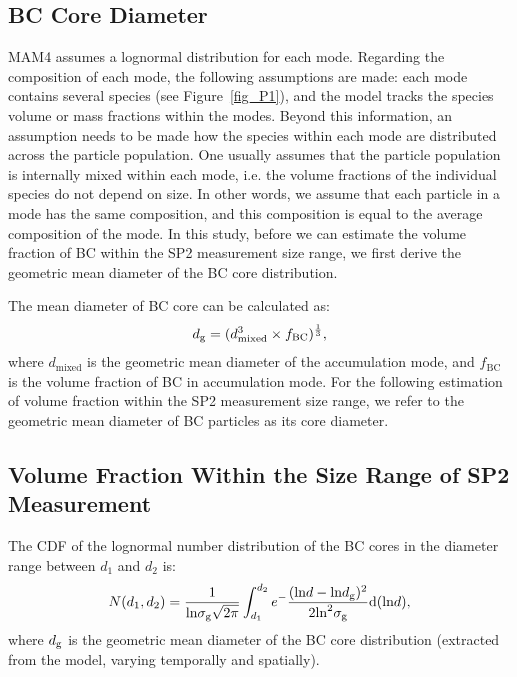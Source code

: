 \documentclass[12pt, fullpage]{uiucthesis2009}
\begin{document}
	\subsection{BC Core Diameter} 
	MAM4 assumes a lognormal distribution for each mode. Regarding the composition of each mode, the following assumptions are made: each mode contains several species (see Figure~\ref{fig_P1}), and the model tracks the species volume or mass fractions within the modes. Beyond this information, an assumption needs to be made how the species within each mode are distributed across the particle population. One usually assumes that the particle population is internally mixed within each mode, i.e. the volume fractions of the individual species do not depend on size. In other words, we assume that each particle in a mode has the same composition, and this composition is equal to the average composition of the mode. 
	In this study, before we can estimate the volume fraction of BC within the SP2 measurement size range, we first derive the geometric mean diameter of the BC core distribution. 
	
	The mean diameter of BC core can be calculated as:
	\begin{align*}
	d_{\rm g} = (d_{\text{mixed}}^3 \times f_{\text{BC}})^\frac{1}{3}, 
	\end{align*}
	where $d_{\text{mixed}}$ is the geometric mean diameter of the accumulation mode, and $f_{\text{BC}}$ is the volume
	fraction of BC in accumulation mode. For the following estimation of volume fraction within the SP2 measurement size range, we refer to the geometric mean diameter of BC particles as its core diameter.
	
	\subsection{Volume Fraction Within the Size Range of SP2 Measurement}
	The CDF of the lognormal number distribution of the BC cores in the diameter range between $d_{1}$ and
	$d_{2}$ is:
	\begin{align*}
	N(d_{1}, d_{2}) = \frac{1}{\text{ln}\sigma_{\text{g}}\sqrt{2\pi}}\int_{d_{1}}^{d_{2}}e^-\frac{(\text{ln}d - \text{ln}d_{\rm g})^2}{2\text{ln}^2\sigma_{\text{g}}}\text{d}(\text{ln}d),
	\end{align*}
	where $d_{\rm g}$ is the geometric mean diameter of the BC core distribution (extracted from the model, varying temporally and spatially). 
	
\end{document}
